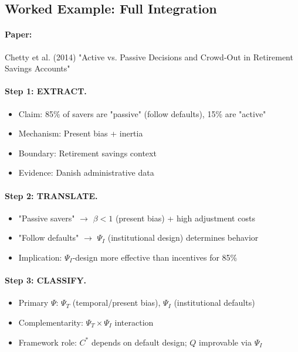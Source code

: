 \subsection{Worked Example: Full Integration}

\paragraph{Paper:} Chetty et al. (2014) "Active vs. Passive Decisions and Crowd-Out 
in Retirement Savings Accounts"

\paragraph{Step 1: EXTRACT.}
\begin{itemize}
  \item Claim: 85\% of savers are "passive" (follow defaults), 15\% are "active"
  \item Mechanism: Present bias + inertia
  \item Boundary: Retirement savings context
  \item Evidence: Danish administrative data
\end{itemize}

\paragraph{Step 2: TRANSLATE.}
\begin{itemize}
  \item "Passive savers" $\to$ $\beta < 1$ (present bias) + high adjustment costs
  \item "Follow defaults" $\to$ $\Psi_I$ (institutional design) determines behavior
  \item Implication: $\Psi_I$-design more effective than incentives for 85\%
\end{itemize}

\paragraph{Step 3: CLASSIFY.}
\begin{itemize}
  \item Primary $\Psi$: $\Psi_T$ (temporal/present bias), $\Psi_I$ (institutional defaults)
  \item Complementarity: $\Psi_T \times \Psi_I$ interaction
  \item Framework role: $C^*$ depends on default design; $Q$ improvable via $\Psi_I$
\end{itemize}

